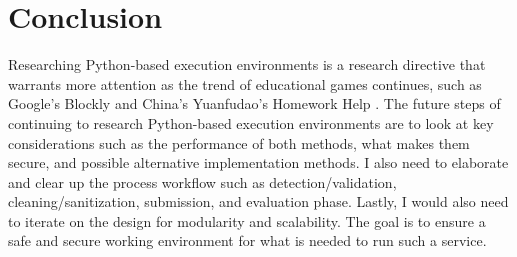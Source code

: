 
\section{Conclusion}
Researching Python-based execution environments is a research directive that warrants more attention as the trend of educational games continues, such as Google’s Blockly \cite{google_blockly} and China’s Yuanfudao's Homework Help \cite{xiaoyuan_kousuan}.
The future steps of continuing to research Python-based execution environments are to look at key considerations such as the performance of both methods, what makes them secure, and possible alternative implementation methods. I also need to elaborate and clear up the process workflow such as detection/validation, cleaning/sanitization, submission, and evaluation phase. Lastly, I would also need to iterate on the design for modularity and scalability. The goal is to ensure a safe and secure working environment for what is needed to run such a service.





